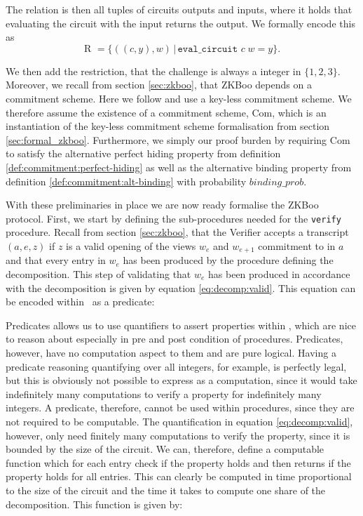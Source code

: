 
The relation is then all tuples of circuits outputs and inputs, where it holds that evaluating the circuit with the input returns the output. We formally encode this as
\begin{equation}
  \text{R } = \{((c,y), w) \,|\, \texttt{eval\_circuit } c \; w = y\}.
\end{equation}

We then add the restriction, that the challenge is always a integer in
$\{1,2,3\}$. Moreover, we recall from section \ref{sec:zkboo}, that ZKBoo
depends on a commitment scheme. Here we follow \cite{zkboo} and use a key-less
commitment scheme. We therefore assume the existence of a commitment scheme,
Com, which is an instantiation of the key-less commitment scheme formalisation
from section \ref{sec:formal_zkboo}. Furthermore, we simply our proof burden by
requiring Com to satisfy the alternative perfect hiding property from definition
\ref{def:commitment:perfect-hiding} as well as the alternative binding property
from definition \ref{def:commitment:alt-binding} with probability $binding\_prob$.

With these preliminaries in place we are now ready formalise the ZKBoo protocol.
First, we start by defining the sub-procedures needed for the \texttt{verify}
procedure. Recall from section \ref{sec:zkboo}, that the Verifier accepts a
transcript $(a,e,z)$ if $z$ is a valid opening of the views $w_{e}$ and
$w_{e+1}$ commitment to in $a$ and that every entry in $w_{e}$ has been produced
by the procedure defining the decomposition. This step of validating that
$w_{e}$ has been produced in accordance with the decomposition is given 
by equation \ref{eq:decomp:valid}.
%
This equation can be encoded within \easycrypt\ as a predicate:


Predicates allows us to use quantifiers to assert properties within \easycrypt , which are nice to
reason about especially in pre and post condition of procedures. Predicates,
however, have no computation aspect to them and are pure logical.
Having a predicate reasoning quantifying over all integers, for example, is
perfectly legal, but this is obviously not possible to express as a computation,
since it would take indefinitely many computations to verify a property for
indefinitely many integers.
A predicate, therefore, cannot be used within procedures, since they are not
required to be computable.
The quantification in equation \ref{eq:decomp:valid}, however, only need
finitely many computations to verify the property, since it is bounded by the
size of the circuit. We can, therefore, define a computable function which for
each entry check if the property holds and then returns if the property holds
for all entries. This can clearly be computed in time proportional to the size
of the circuit and the time it takes to compute one share of the decomposition.
This function is given by:


